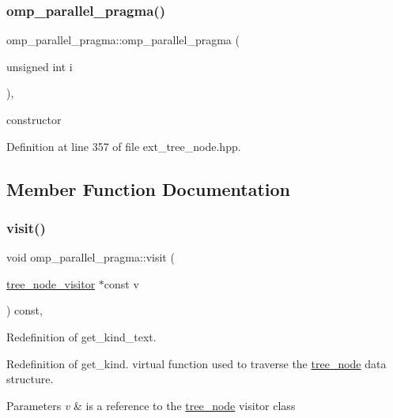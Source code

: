 \subsubsection{\texorpdfstring{omp\+\_\+parallel\+\_\+pragma()}{omp\_parallel\_pragma()}}
{\footnotesize\ttfamily omp\+\_\+parallel\+\_\+pragma\+::omp\+\_\+parallel\+\_\+pragma (\begin{DoxyParamCaption}\item[{unsigned int}]{i }\end{DoxyParamCaption})\hspace{0.3cm}{\ttfamily [inline]}, {\ttfamily [explicit]}}



constructor 



Definition at line 357 of file ext\+\_\+tree\+\_\+node.\+hpp.



\subsection{Member Function Documentation}
\mbox{\label{structomp__parallel__pragma_ac501a81fc5120b8ce8ec7c75fb617b57}} 
\subsubsection{\texorpdfstring{visit()}{visit()}}
{\footnotesize\ttfamily void omp\+\_\+parallel\+\_\+pragma\+::visit (\begin{DoxyParamCaption}\item[{\hyperlink{classtree__node__visitor}{tree\+\_\+node\+\_\+visitor} $\ast$const}]{v }\end{DoxyParamCaption}) const\hspace{0.3cm}{\ttfamily [override]}, {\ttfamily [virtual]}}



Redefinition of get\+\_\+kind\+\_\+text. 

Redefinition of get\+\_\+kind. virtual function used to traverse the \hyperlink{classtree__node}{tree\+\_\+node} data structure. 
\begin{DoxyParams}{Parameters}
{\em v} & is a reference to the \hyperlink{classtree__node}{tree\+\_\+node} visitor class \\
\hline
\end{DoxyParams}


